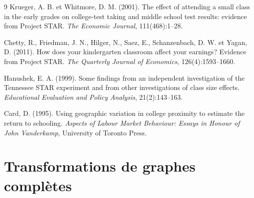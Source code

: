\documentclass[11pt,a4paper]{article}
\begin{document}
\begin{thebibliography}{9}
Krueger, A. B. et Whitmore, D. M. (2001).
The effect of attending a small class in the early grades on college-test taking and middle school test results: evidence from Project STAR.
\textit{The Economic Journal}, 111(468):1--28.

Chetty, R., Friedman, J. N., Hilger, N., Saez, E., Schanzenbach, D. W. et Yagan, D. (2011).
How does your kindergarten classroom affect your earnings? Evidence from Project STAR.
\textit{The Quarterly Journal of Economics}, 126(4):1593--1660.

Hanushek, E. A. (1999).
Some findings from an independent investigation of the Tennessee STAR experiment and from other investigations of class size effects.
\textit{Educational Evaluation and Policy Analysis}, 21(2):143--163.

Card, D. (1995).
Using geographic variation in college proximity to estimate the return to schooling.
\textit{Aspects of Labour Market Behaviour: Essays in Honour of John Vanderkamp}, University of Toronto Press.

\end{thebibliography}

\newpage

\appendix

\section{Transformations de graphes complètes}
\label{app:graphs}
\end{document}
